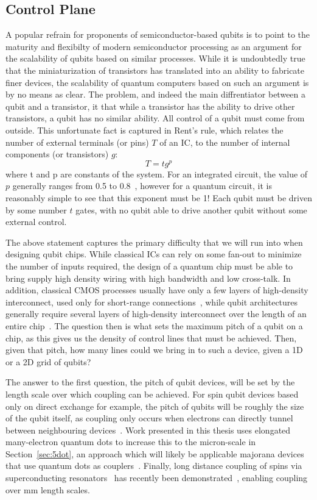 \subsection{Control Plane}
A popular refrain for proponents of semiconductor-based qubits is to point to the maturity and flexibilty of modern semiconductor processing as an argument
for the scalability of qubits based on similar processes. While it is undoubtedly true that the miniaturization of transistors has translated into an ability
to fabricate finer devices, the scalability of quantum computers based on such an argument is by no means as clear. The problem, and indeed the main diffrentiator
between a qubit and a transistor, it that while a transistor has the ability to drive other transistors, a qubit has no similar ability. All control of a qubit
must come from outside. This unfortunate fact is captured in Rent's rule, which relates the number of external terminals (or pins) $T$ of an IC, to the number of
internal components (or transistors) $g$:
\begin{equation}
  T = tg^p
  \label{eq:rent}
\end{equation}
where t and p are constants of the system. For an integrated circuit, the value of $p$ generally ranges from 0.5 to 0.8~\cite{5388820}, however for a quantum
circuit, it is reasonably simple to see that this exponent must be 1! Each qubit must be driven by some number $t$ gates, with no qubit able to drive another
qubit without some external control.

The above statement captures the primary difficulty that we will run into when designing qubit chips. While classical ICs can rely on some fan-out to minimize
the number of inputs required, the design of a quantum chip must be able to bring supply high density wiring with high bandwidth and low cross-talk. In addition,
classical CMOS processes usually have only a few layers of high-density interconnect, used only for short-range connections~\cite{5424258}, while qubit
architectures generally require several layers of high-density interconnect over the length of an entire chip~\cite{s41467-017-01905-6}. The question then is
what sets the maximum pitch of a qubit on a chip, as this gives us the density of control lines that must be achieved. Then, given that pitch, how many lines could
we bring in to such a device, given a 1D or a 2D grid of qubits?

The answer to the first question, the pitch of qubit devices, will be set by the length scale over which coupling can be achieved. For spin qubit devices based only
on direct exchange for example, the pitch of qubits will be roughly the size of the qubit itself, as coupling only occurs when electrons can directly tunnel between
neighbouring devices~\cite{PhysRevB.86.085423}. Work presented in this thesis uses elongated many-electron quantum dots to increase this to the micron-scale in
Section~\ref{sec:5dot}, an approach which will likely be applicable majorana devices that use quantum dots as couplers~\cite{PhysRevB.95.235305}. Finally, long
distance coupling of spins via superconducting resonators~\cite{PhysRevB.97.235409} has recently been demonstrated~\cite{2019arXiv190500776B}, enabling coupling
over \si{\milli\meter} length scales.

